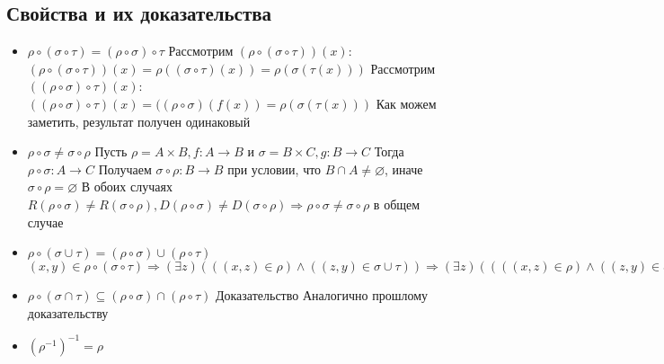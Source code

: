 \documentclass{report}
\begin{document}
\subsection{Свойства и их доказательства}
\begin{itemize}
    \item $\rho \circ (\sigma \circ \tau) = (\rho \circ \sigma) \circ \tau$\newline
          Рассмотрим $(\rho \circ (\sigma \circ \tau))(x)$: $(\rho \circ (\sigma \circ \tau))(x) = \rho((\sigma \circ \tau)(x)) = \rho(\sigma(\tau(x)))$\newline
          Рассмотрим $((\rho \circ \sigma) \circ \tau)(x)$: $((\rho \circ \sigma) \circ \tau)(x) = ((\rho \circ \sigma)(f(x)) = \rho(\sigma(\tau(x)))$\newline
          Как можем заметить, результат получен одинаковый
    \item $\rho \circ \sigma \neq \sigma \circ \rho$\newline
          Пусть $\rho = A \times B, f: A \rightarrow B$ и $\sigma = B \times C, g: B \rightarrow C$\newline
          Тогда $\rho \circ \sigma: A \rightarrow C$\newline
          Получаем $\sigma \circ \rho: B \rightarrow B$ при условии, что $B \cap A \neq \varnothing$, иначе $\sigma \circ \rho = \varnothing$\newline
          В обоих случаях $R(\rho \circ \sigma) \neq R(\sigma \circ \rho),
              D(\rho \circ \sigma) \neq D(\sigma \circ \rho) \Rightarrow
              \rho \circ \sigma \neq \sigma \circ \rho$ в общем случае
    \item $\rho \circ (\sigma \cup \tau) = (\rho \circ \sigma) \cup (\rho \circ \tau)$\newline
          $(x,y) \in \rho \circ (\sigma \circ \tau) \Rightarrow
              (\exists z)(((x,z) \in \rho) \land ((z,y) \in \sigma \cup \tau)) \Rightarrow
              (\exists z)((((x,z) \in \rho) \land ((z,y) \in \sigma) \lor ((z,y) \in \tau))) \Rightarrow
              (\exists u)(((x,u) \in \rho) \land ((u,y) \in \sigma) \lor (\exists v)((x,v) \in \rho \land (v,y) \in \tau))$
    \item  $\rho \circ (\sigma \cap \tau) \subseteq (\rho \circ \sigma) \cap (\rho \circ \tau)$\newline
          Доказательство Аналогично прошлому доказательству
    \item $(\rho^{-1})^{-1} = \rho$\newline

\end{itemize}
\end{document}
